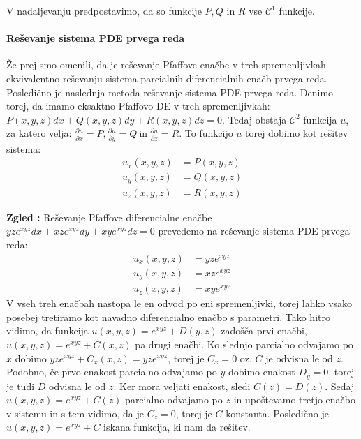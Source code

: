 \documentclass[a4paper, 10pt]{article}
\newcounter{zgledcount}
\newenvironment{zgled}{\begin{flushleft}\refstepcounter{zgledcount}\textbf{Zgled \arabic{zgledcount}:}}{\hfill\end{flushleft}}
\begin{document}
					V nadaljevanju predpostavimo, da so funkcije $P, Q$ in $R$ vse $\mathcal{C}^1$ funkcije.
					\paragraph{Reševanje sistema PDE prvega reda}	
						Že prej smo omenili, da je reševanje Pfaffove enačbe v treh spremenljivkah ekvivalentno reševanju sistema parcialnih diferencialnih enačb prvega reda. Posledično je naslednja metoda reševanje sistema PDE prvega reda. Denimo torej, da imamo eksaktno Pfaffovo DE v treh spremenljivkah: $P(x, y, z)dx + Q(x, y, z)dy + R(x, y, z)dz = 0$. Tedaj obstaja $\mathcal{C}^2$ funkcija $u$, za katero velja: $\frac{\partial u}{\partial x} = P, \frac{\partial u}{\partial y} = Q ~\text{in}~ \frac{\partial u}{\partial z} = R$. To funkcijo $u$ torej dobimo kot rešitev sistema: 
						\begin{align*}
							u_x(x, y, z) &= P(x, y, z) \\
							u_y(x, y, z) &= Q(x, y, z) \\
							u_z(x, y, z) &= R(x, y, z) 
						\end{align*}
					
						\begin{zgled}
							\label{zgl:PDEr1}
							Reševanje Pfaffove diferencialne enačbe $yze^{xyz}dx + xze^{xyz}dy + xye^{xyz}dz = 0$ prevedemo na reševanje sistema PDE prvega reda: \begin{align*}
								u_x(x, y, z) &= yze^{xyz} \\
								u_y(x, y, z) &= xze^{xyz} \\
								u_z(x, y, z) &= xye^{xyz} 
							\end{align*}
							V vseh treh enačbah nastopa le en odvod po eni spremenljivki, torej lahko vsako posebej tretiramo kot navadno diferencialno enačbo s parametri. Tako hitro vidimo, da funkcija $u(x, y, z) = e^{xyz} + D(y, z)$ zadošča prvi enačbi, $u(x, y, z) = e^{xyz} + C(x, z)$ pa drugi enačbi. Ko slednjo parcialno odvajamo po $x$ dobimo $yze^{xyz} + C_x(x, z) = yze^{xyz}$, torej je $C_x = 0$ oz. $C$ je odvisna le od $z$. Podobno, če prvo enakost parcialno odvajamo po $y$ dobimo enakost $D_y = 0$, torej je tudi $D$ odvisna le od $z$. Ker mora veljati enakost, sledi $C(z) = D(z)$. Sedaj $u(x, y, z) = e^{xyz} + C(z)$ parcialno odvajamo po $z$ in upoštevamo tretjo enačbo v sistemu in s tem vidimo, da je $C_z = 0$, torej je $C$ konstanta. Posledično je $u(x, y, z) = e^{xyz} + C$ iskana funkcija, ki nam da rešitev.
						\end{zgled}
\end{document}
